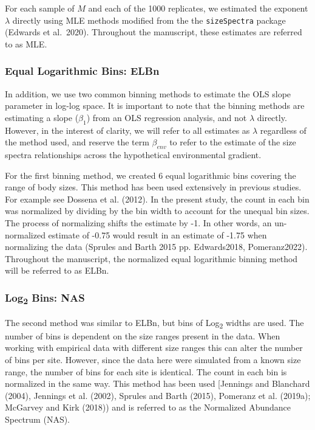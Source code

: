 \documentclass[
]{article}
\begin{document}
For each sample of \(M\) and each of the 1000 replicates, we estimated
the exponent \(\lambda\) directly using MLE methods modified from the
the \texttt{sizeSpectra} package (Edwards et al.~2020). Throughout the
manuscript, these estimates are referred to as MLE.

\hypertarget{equal-logarithmic-bins-elbn}{%
\subsubsection{Equal Logarithmic Bins:
ELBn}\label{equal-logarithmic-bins-elbn}}

In addition, we use two common binning methods to estimate the OLS slope
parameter in log-log space. It is important to note that the binning
methods are estimating a slope (\(\beta_{1}\)) from an OLS regression
analysis, and not \(\lambda\) directly. However, in the interest of
clarity, we will refer to all estimates as \(\lambda\) regardless of the
method used, and reserve the term \(\beta_{env}\) to refer to the
estimate of the size spectra relationships across the hypothetical
environmental gradient.

For the first binning method, we created 6 equal logarithmic bins
covering the range of body sizes. This method has been used extensively
in previous studies. For example see Dossena et al. (2012). In the
present study, the count in each bin was normalized by dividing by the
bin width to account for the unequal bin sizes. The process of
normalizing shifts the estimate by -1. In other words, an un-normalized
estimate of -0.75 would result in an estimate of -1.75 when normalizing
the data (Sprules and Barth 2015 pp. Edwards2018, Pomeranz2022).
Throughout the manuscript, the normalized equal logarithmic binning
method will be referred to as ELBn.

\hypertarget{log2-bins-nas}{%
\subsubsection{\texorpdfstring{Log\textsubscript{2} Bins:
NAS}{Log2 Bins: NAS}}\label{log2-bins-nas}}

The second method was similar to ELBn, but bins of Log\textsubscript{2}
widths are used. The number of bins is dependent on the size ranges
present in the data. When working with empirical data with different
size ranges this can alter the number of bins per site. However, since
the data here were simulated from a known size range, the number of bins
for each site is identical. The count in each bin is normalized in the
same way. This method has been used {[}Jennings and Blanchard (2004),
Jennings et al. (2002), Sprules and Barth (2015), Pomeranz et al.
(2019a); McGarvey and Kirk (2018)) and is referred to as the Normalized
Abundance Spectrum (NAS).
\end{document}
